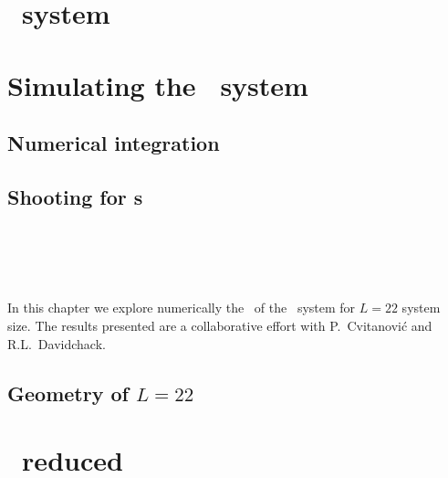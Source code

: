 \chapter{\KS\ system}
\label{chap:KSe}
    \section{\KSe}
    \label{sec:KSe}
    


\chapter{Simulating the \KS\ system}
\label{chap:Numerics}
\section{Numerical integration}
	
\section{Shooting for \rpo s}
        
        


\chapter{\KS\ \statesp}
\label{chap:kseStSp}

In this chapter we explore  numerically the \statesp\ of the \KS\ system
for $L=22$ system size.
The results presented are a
collaborative effort with P.~Cvitanovi\'c and R.L.~Davidchack.

    \section{Geometry of $L=22$ \statesp}
    \label{sec:L22}
    

\chapter{\KS\ reduced \statesp}
    \label{chap:kseRedStSp}	
    


